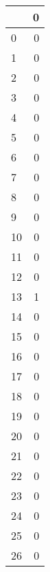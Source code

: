 \begin{tabular}{lr}
\toprule
{} &  0 \\
\midrule
0  &  0 \\
1  &  0 \\
2  &  0 \\
3  &  0 \\
4  &  0 \\
5  &  0 \\
6  &  0 \\
7  &  0 \\
8  &  0 \\
9  &  0 \\
10 &  0 \\
11 &  0 \\
12 &  0 \\
13 &  1 \\
14 &  0 \\
15 &  0 \\
16 &  0 \\
17 &  0 \\
18 &  0 \\
19 &  0 \\
20 &  0 \\
21 &  0 \\
22 &  0 \\
23 &  0 \\
24 &  0 \\
25 &  0 \\
26 &  0 \\
\bottomrule
\end{tabular}
